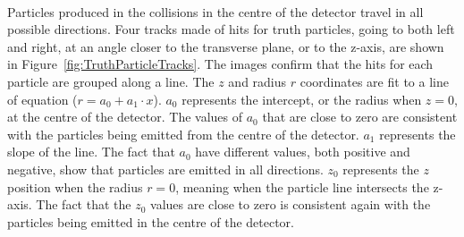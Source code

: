 
\ \\Particles produced in the collisions in the centre of the detector travel in all possible directions. Four tracks made of hits for truth particles, going to both left and right, at an angle closer to the transverse plane, or to the z-axis, are shown in Figure~\ref{fig:TruthParticleTracks}. The images confirm that the hits for each particle are grouped along a line. The $z$ and radius $r$ coordinates are fit to a line of equation ($r = a_0 + a_1 \cdot x$). $a_0$ represents the intercept, or the radius when $z=0$, at the centre of the detector. The values of $a_0$ that are close to zero are consistent with the particles being emitted from the centre of the detector. $a_1$ represents the slope of the line. The fact that $a_0$ have different values, both positive and negative, show that particles are emitted in all directions. $z_0$ represents the $z$ position when the radius $r=0$, meaning when the particle line intersects the z-axis. The fact that the $z_0$ values are close to zero is consistent again with the particles being emitted in the centre of the detector.

